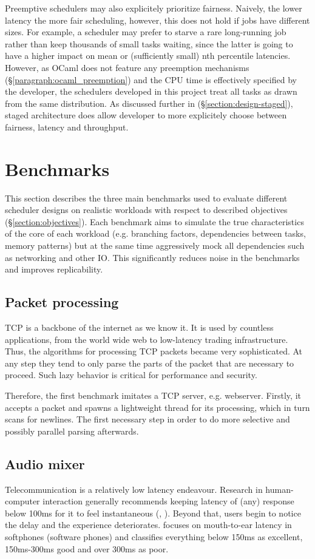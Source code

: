 \documentclass[12pt,a4paper,twoside]{report}
\begin{document}
Preemptive schedulers may also explicitely prioritize fairness. Naively, the lower latency the more fair scheduling, however, this does not hold if jobs have different sizes. For example, a scheduler may prefer to starve a rare long-running job rather than keep thousands of small tasks waiting, since the latter is going to have a higher impact on mean or (sufficiently small) nth percentile latencies. However, as OCaml does not feature any preemption mechanisms (\S\ref{paragraph:ocaml_preemption}) and the CPU time is effectively specified by the developer, the schedulers developed in this project treat all tasks as drawn from the same distribution. As discussed further in (\S\ref{section:design-staged}), staged architecture does allow developer to more explicitely choose between fairness, latency and throughput. 


\section{Benchmarks}
This section describes the three main benchmarks used to evaluate different scheduler designs on realistic workloads with respect to described objectives (\S\ref{section:objectives}). Each benchmark aims to simulate the true characteristics of the core of each workload (e.g. branching factors, dependencies between tasks, memory patterns) but at the same time aggressively mock all dependencies such as networking and other IO. This significantly reduces noise in the benchmarks and improves replicability. 

\subsection{Packet processing}
\label{section:background_packet-processing}
TCP is a backbone of the internet as we know it. It is used by countless applications, from the world wide web to low-latency trading infrastructure. Thus, the algorithms for processing TCP packets became very sophisticated. At any step they tend to only parse the parts of the packet that are necessary to proceed. Such lazy behavior is critical for performance and security.

Therefore, the first benchmark imitates a TCP server, e.g. webserver. Firstly, it accepts a packet and spawns a lightweight thread for its processing, which in turn scans for newlines. The first necessary step in order to do more selective and possibly parallel parsing afterwards. 

\subsection{Audio mixer}
\label{section:bench-audio-mixer}
Telecommunication is a relatively low latency endeavour. Research in human-computer interaction generally recommends keeping latency of (any) response below 100ms for it to feel instantaneous (\cite{Miller1968}, \cite{Amin2013}). Beyond that, users begin to notice the delay and the experience deteriorates. \cite{voip-latency} focuses on mouth-to-ear latency in softphones (software phones) and classifies everything below 150ms as excellent, 150ms-300ms good and over 300ms as poor. 
\end{document}
